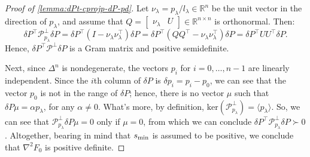 \documentclass[eikonal.tex]{subfiles}
\begin{document}
\begin{proof}[Proof of \cref{lemma:dPt-cprojp-dP-pd}]

  Let $\nu_\lambda = p_\lambda/l_\lambda \in \mathbb{R}^n$ be the unit
  vector in the direction of $p_\lambda$, and assume that
  $Q = \begin{bmatrix} \nu_\lambda & U \end{bmatrix} \in \mathbb{R}^{n
    \times n}$ is orthonormal. Then:
  \begin{equation}
    \delta P^\top \mathcal{P}^\perp_{p_\lambda} \delta P = \delta P^\top {(I - \nu_\lambda \nu_\lambda^\top)} \delta P = \delta P^\top {(QQ^\top - \nu_\lambda \nu_\lambda^\top)} \delta P = \delta P^\top U U^\top \delta P.
  \end{equation}
  Hence, $\delta P^\top \mathcal{P}^\perp \delta P$ is a Gram matrix
  and positive semidefinite.

  Next, since $\Delta^n$ is nondegenerate, the vectors $p_i$ for
  $i = 0, \hdots, n - 1$ are linearly independent. Since the $i$th
  column of $\delta P$ is $\delta p_i = p_i - p_0$, we can see that
  the vector $p_0$ is not in the range of $\delta P$; hence, there is
  no vector $\mu$ such that $\delta P \mu = \alpha p_\lambda$, for any
  $\alpha \neq 0$. What's more, by definition,
  $\text{ker}(\mathcal{P}_{p_\lambda}^\perp) = \langle p_\lambda
  \rangle$. So, we can see that
  $\mathcal{P}^\perp_{p_\lambda} \delta P \mu = 0$ only if $\mu = 0$,
  from which we can conclude
  $\delta P^\top \mathcal{P}^\perp_{p_\lambda} \delta P \succ
  0$. Altogether, bearing in mind that $s_{\operatorname{min}}$ is assumed to be
  positive, we conclude that $\nabla^2 F_0$ is positive definite.
\end{proof}
\end{document}
